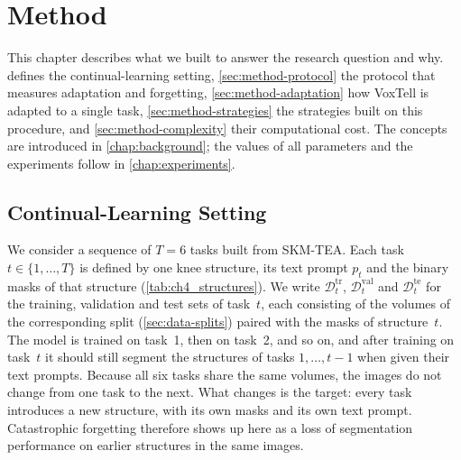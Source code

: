 %

\chapter{Method}
\label{chap:method}

This chapter describes what we built to answer the research question and why.
 defines the continual-learning setting, \cref{sec:method-protocol} the protocol that measures adaptation and forgetting, \cref{sec:method-adaptation} how VoxTell is adapted to a single task, \cref{sec:method-strategies} the strategies built on this procedure, and \cref{sec:method-complexity} their computational cost.
The concepts are introduced in \cref{chap:background}; the values of all parameters and the experiments follow in \cref{chap:experiments}.

\section{Continual-Learning Setting}
\label{sec:method-setting}

We consider a sequence of $T = 6$ tasks built from SKM-TEA.
Each task $t \in \{1, \dots, T\}$ is defined by one knee structure, its text prompt $p_t$ and the binary masks of that structure (\cref{tab:ch4_structures}).
We write $\mathcal{D}_t^{\mathrm{tr}}$, $\mathcal{D}_t^{\mathrm{val}}$ and $\mathcal{D}_t^{\mathrm{te}}$ for the training, validation and test sets of task~$t$, each consisting of the volumes of the corresponding split (\cref{sec:data-splits}) paired with the masks of structure~$t$.
The model is trained on task~1, then on task~2, and so on, and after training on task~$t$ it should still segment the structures of tasks $1, \dots, t-1$ when given their text prompts.
Because all six tasks share the same volumes, the images do not change from one task to the next.
What changes is the target: every task introduces a new structure, with its own masks and its own text prompt.
Catastrophic forgetting therefore shows up here as a loss of segmentation performance on earlier structures in the same images.

